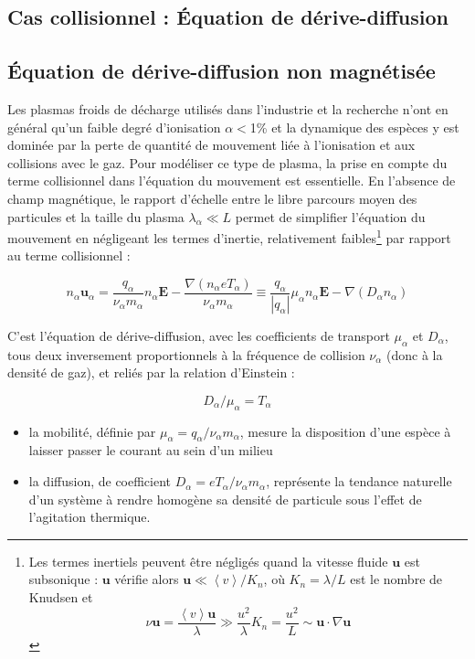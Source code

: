 \begin{refsection}
\section{Cas collisionnel : Équation de dérive-diffusion}
\label{1-transportAmbipolaire}
\subsection{Équation de dérive-diffusion non magnétisée}
Les plasmas froids de décharge utilisés dans l'industrie et la recherche n'ont
en général qu'un faible degré d'ionisation $\alpha<$1\% et la dynamique des
espèces y est dominée par la perte de quantité de mouvement liée à l'ionisation
et aux collisions avec le gaz. Pour modéliser ce type de plasma, la prise en
compte du terme collisionnel dans l'équation du mouvement est essentielle.
En l'absence de champ magnétique, le rapport d'échelle entre le libre parcours moyen des particules
et la taille du plasma $\lambda_\alpha\ll L$ permet de simplifier l'équation du
mouvement en négligeant les termes d'inertie, relativement faibles\footnote{Les
termes inertiels peuvent être négligés quand la vitesse fluide $\mathbf u$ est
subsonique : $\mathbf u$ vérifie alors $\mathbf u\ll \left<v\right>/K_n$, où
$K_n=\lambda/L$ est le nombre de Knudsen et $$\nu \mathbf u=\frac{
\left<v\right>\mathbf u}{\lambda}\gg \frac{u^2}{\lambda}K_n=\frac{u^2}{L}\sim
\mathbf u\cdot\nabla\mathbf u$$} par rapport au terme collisionnel :

\begin{equation}
\label{1-eqDriftDif}
n_\alpha\mathbf u_\alpha=\frac{q_\alpha}{\nu_\alpha m_\alpha}n_\alpha\mathbf
E-\frac{\nabla\left(n_\alpha eT_\alpha\right)}{\nu_\alpha
m_\alpha}\equiv\frac{q_\alpha}{|q_\alpha|}\mu_\alpha n_\alpha\mathbf
E-{\nabla\left(D_\alpha n_\alpha\right)}
\end{equation}

C'est l'équation de dérive-diffusion, avec les coefficients de
transport $\mu_\alpha$ et $D_\alpha$, tous deux
inversement proportionnels à la fréquence de collision $\nu_\alpha$ (donc à la
densité de gaz), et reliés par la relation d'Einstein :

\begin{equation}
\label{1-EinsteinRelation}
D_\alpha/\mu_\alpha=T_\alpha
\end{equation}

\begin{itemize}
  \item la mobilité, définie par $\mu_\alpha=q_\alpha/\nu_\alpha m_\alpha$,
  mesure la disposition d'une espèce à laisser passer le courant au sein d'un milieu
  \item la diffusion, de coefficient $D_\alpha=eT_\alpha/\nu_\alpha m_\alpha$,
  représente la tendance naturelle d'un système à rendre homogène sa densité de particule sous l'effet
  de l'agitation thermique.
\end{itemize}


\end{refsection}
